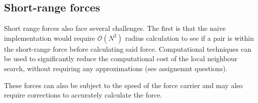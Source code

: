 \subsection{Short-range forces}
\label{sec:nbody:shortrange}
Short range forces also face several challenges. The first is that the naive implementation would require 
$\mathcal{O}(N^2)$ radius calculation to see if a pair is within the short-range force before calculating said force. Computational techniques can be used to significantly reduce the computational cost of the local neighbour search, without requiring any approximations (see assignemnt questions).

\par 
These forces can also be subject to the speed of the force carrier and may also require corrections to accurately calculate the force. 

